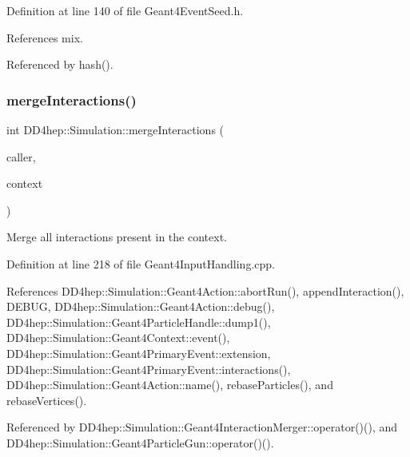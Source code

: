 Definition at line 140 of file Geant4\+Event\+Seed.\+h.



References mix.



Referenced by hash().

\hypertarget{namespace_d_d4hep_1_1_simulation_a443dcc90d4d35ae2cab73956bbd2a2d8}{}\label{namespace_d_d4hep_1_1_simulation_a443dcc90d4d35ae2cab73956bbd2a2d8} 
\subsubsection{\texorpdfstring{merge\+Interactions()}{mergeInteractions()}}
{\footnotesize\ttfamily int D\+D4hep\+::\+Simulation\+::merge\+Interactions (\begin{DoxyParamCaption}\item[{const \hyperlink{class_d_d4hep_1_1_simulation_1_1_geant4_action}{Geant4\+Action} $\ast$}]{caller,  }\item[{const \hyperlink{class_d_d4hep_1_1_simulation_1_1_geant4_context}{Geant4\+Context} $\ast$}]{context }\end{DoxyParamCaption})}



Merge all interactions present in the context. 



Definition at line 218 of file Geant4\+Input\+Handling.\+cpp.



References D\+D4hep\+::\+Simulation\+::\+Geant4\+Action\+::abort\+Run(), append\+Interaction(), D\+E\+B\+UG, D\+D4hep\+::\+Simulation\+::\+Geant4\+Action\+::debug(), D\+D4hep\+::\+Simulation\+::\+Geant4\+Particle\+Handle\+::dump1(), D\+D4hep\+::\+Simulation\+::\+Geant4\+Context\+::event(), D\+D4hep\+::\+Simulation\+::\+Geant4\+Primary\+Event\+::extension, D\+D4hep\+::\+Simulation\+::\+Geant4\+Primary\+Event\+::interactions(), D\+D4hep\+::\+Simulation\+::\+Geant4\+Action\+::name(), rebase\+Particles(), and rebase\+Vertices().



Referenced by D\+D4hep\+::\+Simulation\+::\+Geant4\+Interaction\+Merger\+::operator()(), and D\+D4hep\+::\+Simulation\+::\+Geant4\+Particle\+Gun\+::operator()().

\hypertarget{namespace_d_d4hep_1_1_simulation_a55e61205dd2ea197dfb955e34c8dec6a}{}\label{namespace_d_d4hep_1_1_simulation_a55e61205dd2ea197dfb955e34c8dec6a} 
